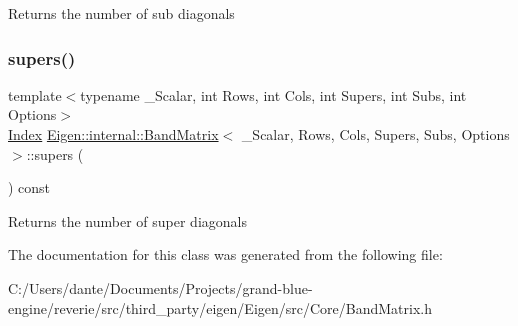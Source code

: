 \begin{DoxyReturn}{Returns}
the number of sub diagonals 
\end{DoxyReturn}
\mbox{\label{class_eigen_1_1internal_1_1_band_matrix_a0c7b513e0e6fb1df19a13beba8a5ef94}} 
\subsubsection{\texorpdfstring{supers()}{supers()}}
{\footnotesize\ttfamily template$<$typename \+\_\+\+Scalar, int Rows, int Cols, int Supers, int Subs, int Options$>$ \\
\mbox{\hyperlink{struct_eigen_1_1_eigen_base_a554f30542cc2316add4b1ea0a492ff02}{Index}} \mbox{\hyperlink{class_eigen_1_1internal_1_1_band_matrix}{Eigen\+::internal\+::\+Band\+Matrix}}$<$ \+\_\+\+Scalar, Rows, Cols, Supers, Subs, Options $>$\+::supers (\begin{DoxyParamCaption}{ }\end{DoxyParamCaption}) const\hspace{0.3cm}{\ttfamily [inline]}}

\begin{DoxyReturn}{Returns}
the number of super diagonals 
\end{DoxyReturn}


The documentation for this class was generated from the following file\+:\begin{DoxyCompactItemize}
\item 
C\+:/\+Users/dante/\+Documents/\+Projects/grand-\/blue-\/engine/reverie/src/third\+\_\+party/eigen/\+Eigen/src/\+Core/Band\+Matrix.\+h\end{DoxyCompactItemize}
